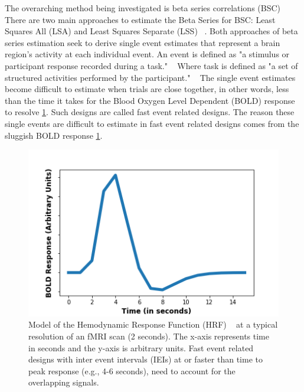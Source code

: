 \documentclass[10pt,letterpaper]{article}
\begin{document}
The overarching method being investigated is beta series correlations (BSC) ~\cite{Rissman2004,Mumford2012,Turner2012a,Abdulrahman2016}
There are two main approaches to estimate the Beta Series for BSC: Least Squares All (LSA) and Least Squares Separate (LSS) ~\cite{Mumford2012}.
Both approaches of beta series estimation seek to derive single event estimates that represent a brain region's activity
at each individual event.
An event is defined as "a stimulus or participant response recorded during a task." ~\cite{Gorgolewski2016}
Where task is defined as "a set of structured activities performed by the participant." ~\cite{Gorgolewski2016}
The single event estimates become difficult to estimate when trials are close together,
in other words, less than the time it takes for the Blood Oxygen Level Dependent (BOLD) response to resolve \ref{fig:introhrf}.
Such designs are called fast event related designs.
The reason these single events are difficult to estimate in fast event related designs comes from
the sluggish BOLD response \ref{fig:introhrf}.

\begin{figure}[H]
  \centering
  \includegraphics[width=\textwidth]{introduction-hrf}
  \caption{
    Model of the Hemodynamic Response Function (HRF) ~\cite{Glover1999} at a
    typical resolution of an fMRI scan (2 seconds).
    The x-axis represents time in seconds and the y-axis is arbitrary units.
    Fast event related designs with inter event intervals (IEIs) at or faster than time to peak
    response (e.g., 4-6 seconds), need to account for the overlapping signals.
  }
  \label{fig:introhrf}
\end{figure}
\end{document}
